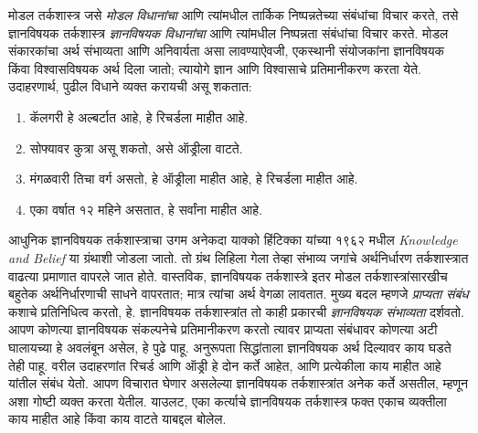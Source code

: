 \documentclass[../../../include/open-logic-section]{subfiles}
\begin{document}


मोडल तर्कशास्त्र जसे \emph{मोडल विधानांचा} आणि
त्यांमधील तार्किक निष्पन्नतेच्या संबंधांचा विचार
करते, तसे ज्ञानविषयक तर्कशास्त्र \emph{ज्ञानविषयक
विधानांचा} आणि त्यांमधील निष्पन्नता संबंधांचा विचार
करते. मोडल संकारकांचा अर्थ संभाव्यता आणि
अनिवार्यता असा लावण्याऐवजी, एकस्थानी संयोजकांना
ज्ञानविषयक किंवा विश्वासविषयक अर्थ दिला जातो;
त्यायोगे ज्ञान आणि विश्वासाचे प्रतिमानीकरण करता
येते. उदाहरणार्थ, पुढील विधाने व्यक्त करायची
असू शकतात:

\begin{enumerate}
\item कॅलगरी हे अल्बर्टात आहे, हे रिचर्डला माहीत आहे.
\item सोफ्यावर कुत्रा असू शकतो, असे ऑड्रीला वाटते.
\item मंगळवारी तिचा वर्ग असतो, हे ऑड्रीला माहीत
  आहे, हे रिचर्डला माहीत आहे.
\item एका वर्षात १२ महिने असतात, हे सर्वांना माहीत आहे.
\end{enumerate}
आधुनिक ज्ञानविषयक तर्कशास्त्राचा उगम अनेकदा
याक्को हिंटिक्का यांच्या १९६२ मधील \emph{Knowledge
and Belief} या ग्रंथाशी जोडला जातो. तो ग्रंथ
लिहिला गेला तेव्हा संभाव्य जगांचे अर्थनिर्धारण
तर्कशास्त्रात वाढत्या प्रमाणात वापरले जात होते.
वास्तविक, ज्ञानविषयक तर्कशास्त्रे इतर मोडल
तर्कशास्त्रांसारखीच बहुतेक अर्थनिर्धारणाची साधने
वापरतात; मात्र त्यांचा अर्थ वेगळा लावतात. मुख्य
बदल म्हणजे \emph{प्राप्यता संबंध} कशाचे प्रतिनिधित्व
करतो, हे. ज्ञानविषयक तर्कशास्त्रांत तो काही प्रकारची
\emph{ज्ञानविषयक संभाव्यता} दर्शवतो. आपण कोणत्या
ज्ञानविषयक संकल्पनेचे प्रतिमानीकरण करतो त्यावर
प्राप्यता संबंधावर कोणत्या अटी घालायच्या हे अवलंबून
असेल, हे पुढे पाहू. अनुरूपता सिद्धांताला ज्ञानविषयक
अर्थ दिल्यावर काय घडते तेही पाहू. वरील उदाहरणांत
रिचर्ड आणि ऑड्री हे दोन कर्ते आहेत, आणि प्रत्येकीला
काय माहीत आहे यांतील संबंध येतो. आपण विचारात
घेणार असलेल्या ज्ञानविषयक तर्कशास्त्रांत अनेक कर्ते
असतील, म्हणून अशा गोष्टी व्यक्त करता येतील.
याउलट, एका कर्त्याचे ज्ञानविषयक तर्कशास्त्र फक्त
एकाच व्यक्तीला काय माहीत आहे किंवा काय वाटते
याबद्दल बोलेल.
\end{document}

